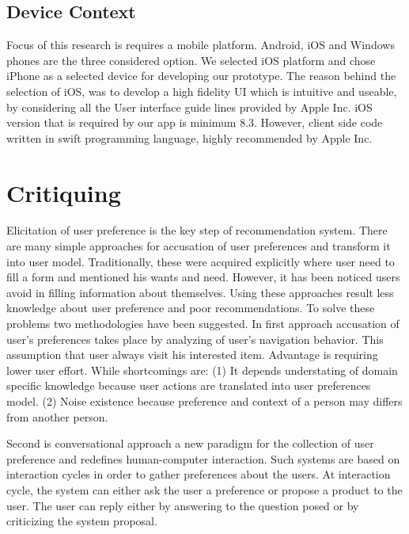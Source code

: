 \subsection{Device Context}
	
Focus of this research is requires a mobile platform. Android, iOS and Windows phones are the three considered option. We selected iOS platform and chose iPhone as a selected device for developing our prototype. The reason behind the selection of iOS, was to develop a high fidelity UI which is intuitive and useable, by considering all the User interface guide lines provided by Apple Inc. iOS version that is required by our app is minimum 8.3. However, client side code written in swift programming language, highly recommended by Apple Inc.


\section{Critiquing}

Elicitation of user preference is the key step of recommendation system. There are many simple approaches for accusation of user preferences and transform it into user model. Traditionally, these were acquired explicitly where user need to fill a form and mentioned his wants and need. However, it has been noticed users avoid in filling information about themselves. Using these approaches result less knowledge about user preference and poor recommendations. To solve these problems two methodologies have been suggested. In first approach accusation of user’s preferences takes place by analyzing of user’s navigation behavior. This assumption that user always visit his interested item. Advantage is requiring lower user effort. While shortcomings are: (1) It depends understating of domain specific knowledge because user actions are translated into user preferences model. (2) Noise existence because preference and context of a person may differs from another person.\newline

Second is conversational approach a new paradigm for the collection of user preference and redefines human-computer interaction. Such systems are based on interaction cycles in order to gather preferences about the users. At interaction cycle, the system can either ask the user a preference or propose a product to the user. The user can reply either by answering to the question posed or by criticizing the system proposal.\cite{ricci2005critique}\newline

